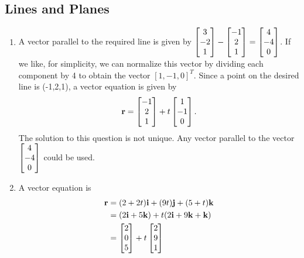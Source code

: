 \subsection{Lines and Planes}
\BEN

\item
\begin{enumerate}
\item 

A vector parallel to the required line is given by $\begin{bmatrix} 3\\ -2\\1\end{bmatrix} - \begin{bmatrix} -1 \\2 \\ 1\end{bmatrix}  = \begin{bmatrix} 4 \\-4 \\0 \end{bmatrix}$. If we like, for simplicity, we can normalize this vector by dividing each component by 4 to obtain the vector $[1,-1,0]^T$. Since a point on the desired line is (-1,2,1), a vector equation is given by 
\begin{align*}
\mathbf{r}=\begin{bmatrix}-1 \\2 \\1\end{bmatrix}+t\begin{bmatrix}1 \\ -1 \\0 \end{bmatrix}.
\end{align*}
The solution to this question is not unique. Any vector parallel to the vector $\begin{bmatrix} 4 \\ -4 \\ 0 \end{bmatrix}$ could be used. 

\item 
A vector equation is 
\begin{align*}
\mathbf{r} &= (2+2t)\mathbf{i} + (9t)\mathbf{j} + (5+t)\mathbf{k} \\
&= (2\mathbf{i} + 5\mathbf{k}) + t(2\mathbf{i} + 9\mathbf{k} + \mathbf{k}) \\
&= \begin{bmatrix} 2 \\ 0 \\ 5 \end{bmatrix} + t \begin{bmatrix} 2 \\ 9 \\1 \end{bmatrix}
\end{align*}
\end{enumerate}
\item
